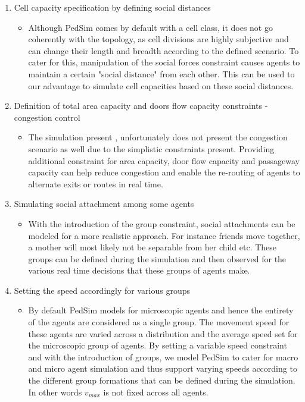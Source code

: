 \begin{enumerate}
  \item Cell capacity specification by defining social distances
  \begin{itemize}
  	\item Although PedSim comes by default with a cell class, it does not go coherently with the topology, as cell divisions are highly subjective and can change their length and breadth according to the defined scenario. To cater for this, manipulation of the social forces constraint causes agents to maintain a certain "social distance" from each other. This can be used to our advantage to simulate cell capacities based on these social distances.
  \end{itemize}
  \item Definition of total area capacity and doors flow capacity constraints -congestion control
  \begin{itemize}
  	\item The simulation present \cite{ref5}, unfortunately does not present the congestion scenario as well due to the simplistic constraints present. Providing additional constraint for area capacity, door flow capacity and passageway capacity can help reduce congestion and enable the re-routing of agents to alternate exits or routes in real time.
  \end{itemize}
  \item Simulating social attachment among some agents
  \begin{itemize}
  	\item With the introduction of the group constraint, social attachments can be modeled for a more realistic approach. For instance friends move together, a mother will most likely not be separable from her child etc. These groups can be defined during the simulation and then observed for the various real time decisions that these groups of agents make.
  \end{itemize}
  \item Setting the speed accordingly for various groups
  \begin{itemize}
  	\item By default PedSim models for microscopic agents and hence the entirety of the agents are considered as a single group. The movement speed for these agents are varied across a distribution and the average speed set for the microscopic group of agents. By setting a variable speed constraint and with the introduction of groups, we model PedSim to cater for macro and micro agent simulation and thus support varying speeds according to the different group formations that can be defined during the simulation. In other words $v_{max}$ is not fixed across all agents.
  \end{itemize}
\end{enumerate}


